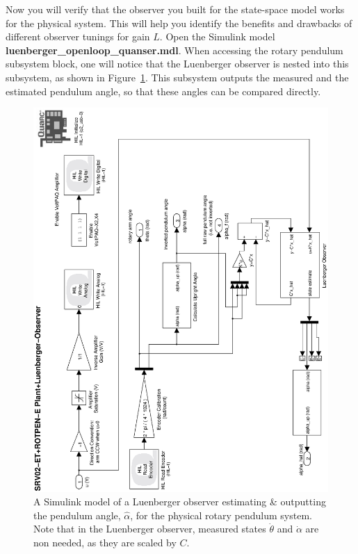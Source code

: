 \begin{enumerate}
\begin{enumerate}
                    Now you will verify that the observer you built for the state-space model works for the physical system. This will help you identify the benefits and drawbacks of different observer tunings for gain $L$. Open the Simulink model \textbf{luenberger\_openloop\_quanser.mdl}. When accessing the rotary pendulum subsystem block, one will notice that the Luenberger observer is nested into this subsystem, as shown in Figure~\ref{figure:lab3_luenberger_openloop_quanser}. This subsystem outputs the measured and the estimated pendulum angle, so that these angles can be compared directly.
                    \begin{figure}[htb!]
                        \centering
                        \includegraphics[width=0.6\linewidth,angle=-90]{eps/lab_3/luenberger_openloop_quanser}
                        \caption{A Simulink model of a Luenberger observer estimating \& outputting the pendulum angle, $\hat{\alpha}$, for the physical rotary pendulum system. Note that in the Luenberger observer, measured states $\dot{\theta}$ and $\dot{\alpha}$ are non needed, as they are scaled by $C$.}
                        \label{figure:lab3_luenberger_openloop_quanser}
                    \end{figure}
                    \newpage

\end{enumerate}
\end{enumerate}
